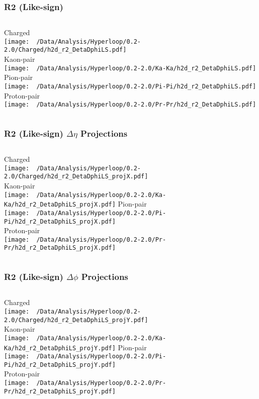 \documentclass{beamer}
\begin{document}
\begin{frame}
	\frametitle{R2 (Like-sign)}
	\begin{columns}
		\centering
		Charged\\
		\texttt{[image: ~/Data/Analysis/Hyperloop/0.2-2.0/Charged/h2d\_r2\_DetaDphiLS.pdf]}\\Kaon-pair\\
		\texttt{[image: ~/Data/Analysis/Hyperloop/0.2-2.0/Ka-Ka/h2d\_r2\_DetaDphiLS.pdf]}
		\centering
		Pion-pair\\
		\texttt{[image: ~/Data/Analysis/Hyperloop/0.2-2.0/Pi-Pi/h2d\_r2\_DetaDphiLS.pdf]}\\Proton-pair\\
		\texttt{[image: ~/Data/Analysis/Hyperloop/0.2-2.0/Pr-Pr/h2d\_r2\_DetaDphiLS.pdf]}
	\end{columns}
\end{frame}
\begin{frame}
	\frametitle{R2 (Like-sign) $\Delta\eta$ Projections}
	\begin{columns}
		\column{0.5\textwidth}
		\centering
		Charged\\
		\texttt{[image: ~/Data/Analysis/Hyperloop/0.2-2.0/Charged/h2d\_r2\_DetaDphiLS\_projX.pdf]}\\Kaon-pair\\
		\texttt{[image: ~/Data/Analysis/Hyperloop/0.2-2.0/Ka-Ka/h2d\_r2\_DetaDphiLS\_projX.pdf]}
		\column{0.5\textwidth}
		\centering
		Pion-pair\\
		\texttt{[image: ~/Data/Analysis/Hyperloop/0.2-2.0/Pi-Pi/h2d\_r2\_DetaDphiLS\_projX.pdf]}\\Proton-pair\\
		\texttt{[image: ~/Data/Analysis/Hyperloop/0.2-2.0/Pr-Pr/h2d\_r2\_DetaDphiLS\_projX.pdf]}
	\end{columns}
\end{frame}
\begin{frame}
	\frametitle{R2 (Like-sign) $\Delta\phi$ Projections}
	\begin{columns}
		\centering
		Charged\\
		\texttt{[image: ~/Data/Analysis/Hyperloop/0.2-2.0/Charged/h2d\_r2\_DetaDphiLS\_projY.pdf]}\\Kaon-pair\\
		\texttt{[image: ~/Data/Analysis/Hyperloop/0.2-2.0/Ka-Ka/h2d\_r2\_DetaDphiLS\_projY.pdf]}
		\centering
		Pion-pair\\
		\texttt{[image: ~/Data/Analysis/Hyperloop/0.2-2.0/Pi-Pi/h2d\_r2\_DetaDphiLS\_projY.pdf]}\\Proton-pair\\
		\texttt{[image: ~/Data/Analysis/Hyperloop/0.2-2.0/Pr-Pr/h2d\_r2\_DetaDphiLS\_projY.pdf]}
	\end{columns}
\end{frame}
\end{document}
